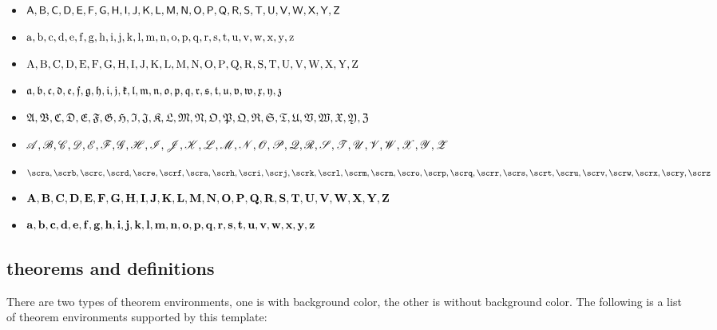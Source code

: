 \begin{itemize}
    \item \(\sfA, \sfB, \sfC, \sfD, \sfE, \sfF, \sfG, \sfH, \sfI, \sfJ, \sfK, \sfL, \sfM, \sfN, \sfO, \sfP, \sfQ, \sfR, \sfS, \sfT, \sfU, \sfV, \sfW, \sfX, \sfY, \sfZ\)
    \item \(\rma, \rmb, \rmc, \rmd, \rme, \rmf, \rmg, \rmh, \rmi, \rmj, \rmk, \rml, \rmm, \rmn, \rmo, \rmp, \rmq, \rmr, \rms, \rmt, \rmu, \rmv, \rmw, \rmx, \rmy, \rmz\)
    \item \(\rmA, \rmB, \rmC, \rmD, \rmE, \rmF, \rmG, \rmH, \rmI, \rmJ, \rmK, \rmL, \rmM, \rmN, \rmO, \rmP, \rmQ, \rmR, \rmS, \rmT, \rmU, \rmV, \rmW, \rmX, \rmY, \rmZ\)
    \item \(\fraka, \frakb, \frakc, \frakd, \frake, \frakf, \frakg, \frakh, \fraki, \frakj, \frakk, \frakl, \frakm, \frakn, \frako, \frakp, \frakq, \frakr, \fraks, \frakt, \fraku, \frakv, \frakw, \frakx, \fraky, \frakz\)
    \item \(\frakA, \frakB, \frakC, \frakD, \frakE, \frakF, \frakG, \frakH, \frakI, \frakJ, \frakK, \frakL, \frakM, \frakN, \frakO, \frakP, \frakQ, \frakR, \frakS, \frakT, \frakU, \frakV, \frakW, \frakX, \frakY, \frakZ\)
    \item \(\scrA, \scrB, \scrC, \scrD, \scrE, \scrF, \scrG, \scrH, \scrI, \scrJ, \scrK, \scrL, \scrM, \scrN, \scrO, \scrP, \scrQ, \scrR, \scrS, \scrT, \scrU, \scrV, \scrW, \scrX, \scrY, \scrZ\)
    \item \(\scra, \scrb, \scrc, \scrd, \scre, \scrf, \scra, \scrh, \scri, \scrj, \scrk, \scrl, \scrm, \scrn, \scro, \scrp, \scrq, \scrr, \scrs, \scrt, \scru, \scrv, \scrw, \scrx, \scry, \scrz\)
    \item \(\bfA, \bfB, \bfC, \bfD, \bfE, \bfF, \bfG, \bfH, \bfI, \bfJ, \bfK, \bfL, \bfM, \bfN, \bfO, \bfP, \bfQ, \bfR, \bfS, \bfT, \bfU, \bfV, \bfW, \bfX, \bfY, \bfZ\)
    \item \(\bfa, \bfb, \bfc, \bfd, \bfe, \bff, \bfg, \bfh, \bfi, \bfj, \bfk, \bfl, \bfm, \bfn, \bfo, \bfp, \bfq, \bfr, \bfs, \bft, \bfu, \bfv, \bfw, \bfx, \bfy, \bfz\)
\end{itemize}

\subsection{theorems and definitions}
    
    There are two types of theorem environments, one is with background color, the other is without background color. 
    The following is a list of theorem environments supported by this template:

